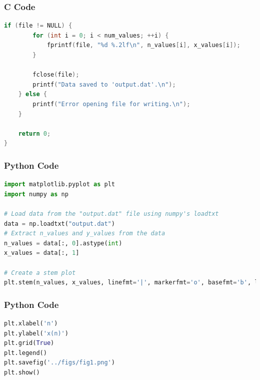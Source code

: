 \documentclass{beamer}
\begin{document}
\begin{frame}[fragile]
\frametitle{C Code}
\begin{lstlisting}[language=C]
    if (file != NULL) {
        for (int i = 0; i < num_values; ++i) {
            fprintf(file, "%d %.2lf\n", n_values[i], x_values[i]);
        }

        fclose(file);
        printf("Data saved to 'output.dat'.\n");
    } else {
        printf("Error opening file for writing.\n");
    }

    return 0;
}
\end{lstlisting}
\end{frame}

\begin{frame}[fragile]
\frametitle{Python Code}
\begin{lstlisting}[language=Python]
import matplotlib.pyplot as plt
import numpy as np

# Load data from the "output.dat" file using numpy's loadtxt
data = np.loadtxt("output.dat")
# Extract n_values and y_values from the data
n_values = data[:, 0].astype(int)
x_values = data[:, 1]

# Create a stem plot
plt.stem(n_values, x_values, linefmt='|', markerfmt='o', basefmt='b', label='Stem Plot')
\end{lstlisting}
\end{frame}


\begin{frame}[fragile]
\frametitle{Python Code}
\begin{lstlisting}[language=Python]
plt.xlabel('n')
plt.ylabel('x(n)')
plt.grid(True)
plt.legend()
plt.savefig('../figs/fig1.png')
plt.show()
\end{lstlisting}
\end{frame}
\end{document}
